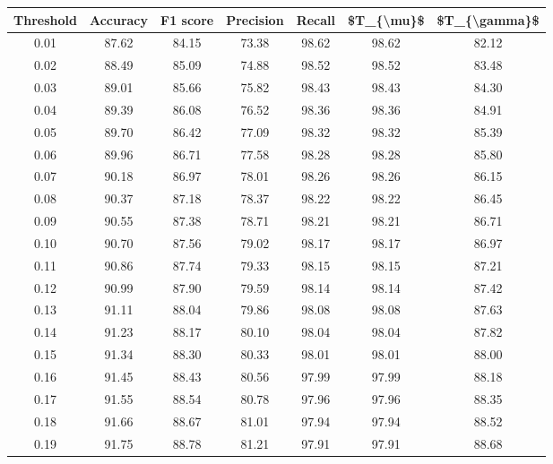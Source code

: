 \begin{tabular}{|c|c|c|c|c|c|c|}
\hline
 Threshold &  Accuracy &  F1 score &  Precision &  Recall &  \$T\_\{\textbackslash mu\}\$ &  \$T\_\{\textbackslash gamma\}\$ \\
\hline
      0.01 &     87.62 &     84.15 &      73.38 &   98.62 &      98.62 &         82.12 \\
      0.02 &     88.49 &     85.09 &      74.88 &   98.52 &      98.52 &         83.48 \\
      0.03 &     89.01 &     85.66 &      75.82 &   98.43 &      98.43 &         84.30 \\
      0.04 &     89.39 &     86.08 &      76.52 &   98.36 &      98.36 &         84.91 \\
      0.05 &     89.70 &     86.42 &      77.09 &   98.32 &      98.32 &         85.39 \\
      0.06 &     89.96 &     86.71 &      77.58 &   98.28 &      98.28 &         85.80 \\
      0.07 &     90.18 &     86.97 &      78.01 &   98.26 &      98.26 &         86.15 \\
      0.08 &     90.37 &     87.18 &      78.37 &   98.22 &      98.22 &         86.45 \\
      0.09 &     90.55 &     87.38 &      78.71 &   98.21 &      98.21 &         86.71 \\
      0.10 &     90.70 &     87.56 &      79.02 &   98.17 &      98.17 &         86.97 \\
      0.11 &     90.86 &     87.74 &      79.33 &   98.15 &      98.15 &         87.21 \\
      0.12 &     90.99 &     87.90 &      79.59 &   98.14 &      98.14 &         87.42 \\
      0.13 &     91.11 &     88.04 &      79.86 &   98.08 &      98.08 &         87.63 \\
      0.14 &     91.23 &     88.17 &      80.10 &   98.04 &      98.04 &         87.82 \\
      0.15 &     91.34 &     88.30 &      80.33 &   98.01 &      98.01 &         88.00 \\
      0.16 &     91.45 &     88.43 &      80.56 &   97.99 &      97.99 &         88.18 \\
      0.17 &     91.55 &     88.54 &      80.78 &   97.96 &      97.96 &         88.35 \\
      0.18 &     91.66 &     88.67 &      81.01 &   97.94 &      97.94 &         88.52 \\
      0.19 &     91.75 &     88.78 &      81.21 &   97.91 &      97.91 &         88.68 \\

\end{tabular}

